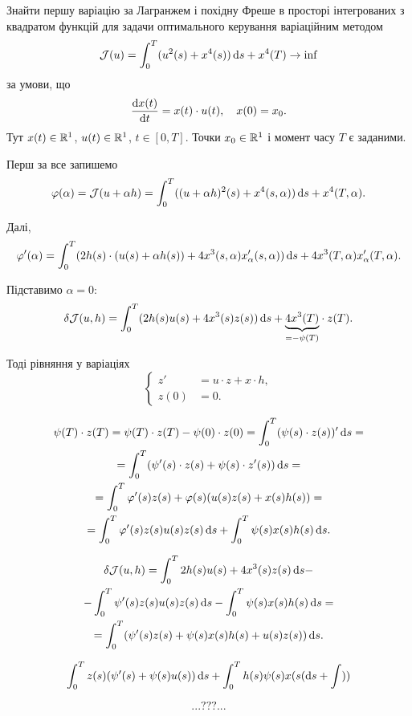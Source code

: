 \begin{problem}
	Знайти першу варіацію за Лагранжем і похідну Фреше в просторі інтегрованих з квадратом функцій для задачи оптимального керування варіаційним методом \[ \mathcal{J}(u) = \int_0^T (u^2(s) + x^4(s)) \mathop{}\!\mathrm{d} s + x^4(T) \to \inf \] за умови, що \[ \frac{\mathop{}\!\mathrm{d} x(t)}{\mathop{}\!\mathrm{d} t} = x(t) \cdot u(t), \quad x(0) = x_0. \] Тут $x(t) \in \mathbb{R}^1$, $u(t)\in\mathbb{R}^1$, $t\in[0,T]$. Точки $x_0\in\mathbb{R}^1$ і момент часу $T$ є заданими.
\end{problem}

\begin{solution}
	Перш за все запишемо
	\[ \varphi(\alpha) = \mathcal{J}(u + \alpha h) = \int_0^T ((u + \alpha h)^2(s) + x^4(s, \alpha)) \mathop{}\!\mathrm{d} s + x^4(T, \alpha). \]

	Далі, \[ \varphi'(\alpha) = \int_0^T (2 h(s) \cdot (u(s) + \alpha h(s)) + 4 x^3(s, \alpha) x_\alpha'(s, \alpha)) \mathop{}\!\mathrm{d} s + 4 x^3 (T, \alpha) x_\alpha'(T, \alpha). \]

	Підставимо $\alpha = 0$: \[ \delta \mathcal{J}(u, h) = \int_0^T (2 h(s) u(s) + 4 x^3(s) z(s)) \mathop{}\!\mathrm{d} s + \underset{=-\psi(T)}{\underbrace{4 x^3(T)}} \cdot z(T).\] 

	Тоді рівняння у варіаціях \[ \left\{ \begin{aligned} 
		z' &= u \cdot z + x \cdot h, \\
		z(0) &= 0.
	\end{aligned} \right. \]

	\begin{multline*} 
		\psi(T) \cdot z(T) = \psi(T) \cdot z(T) - \psi(0) \cdot z(0) = \int_0^T (\psi(s) \cdot z(s))' \mathop{}\!\mathrm{d} s = \\
		= \int_0^T (\psi'(s) \cdot z(s) + \psi(s) \cdot z'(s)) \mathop{}\!\mathrm{d} s = \\
		= \int_0^T \varphi'(s) z(s) + \varphi(s) (u(s) z(s) + x(s) h(s)) = \\
		= \int_0^T \varphi'(s) z(s) u(s) z(s) \mathop{}\!\mathrm{d} s + \int_0^T \psi(s) x(s) h(s) \mathop{}\!\mathrm{d} s.
	\end{multline*}

	\begin{multline*} 
		\delta \mathcal{J}(u, h) = \int_0^T 2 h(s) u(s) + 4 x^3(s) z(s) \mathop{}\!\mathrm{d} s - \\
		- \int_0^T \psi'(s) z(s) u(s) z(s) \mathop{}\!\mathrm{d} s - \int_0^T \psi(s) x(s) h(s) \mathop{}\!\mathrm{d} s = \\
		= \int_0^T (\psi'(s) z(s) + \psi(s) x(s) h(s) + u(s) z(s)) \mathop{}\!\mathrm{d} s.
	\end{multline*}

	\[ \int_0^T z(s) (\psi'(s) + \psi(s) u(s)) \mathop{}\!\mathrm{d} s + \int_0^T h(s) \psi(s) x(s( \mathop{}\!\mathrm{d} s + \int)) \]

	\[ ... ??? ... \]


\end{solution}

